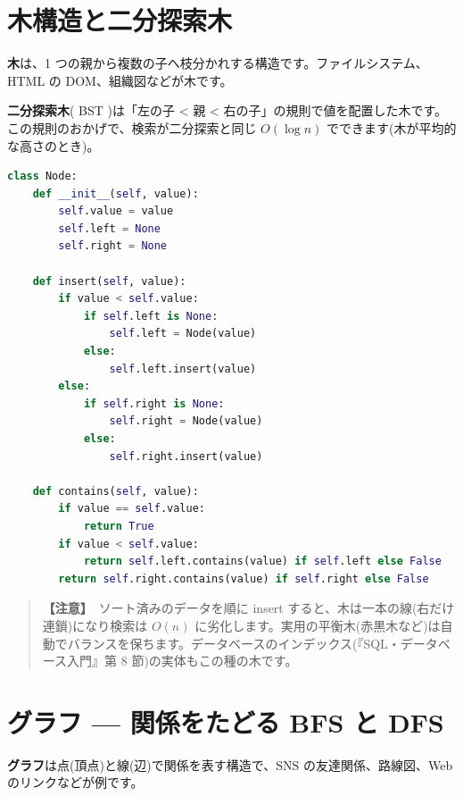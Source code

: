 \documentclass{article}
\begin{document}
\section{木構造と二分探索木}

\textbf{木}は、1 つの親から複数の子へ枝分かれする構造です。ファイルシステム、HTML の DOM、組織図などが木です。

\textbf{二分探索木}( BST )は「左の子 < 親 < 右の子」の規則で値を配置した木です。この規則のおかげで、検索が二分探索と同じ \(O(\log n)\) でできます(木が平均的な高さのとき)。

\begin{lstlisting}[language=Python]
class Node:
    def __init__(self, value):
        self.value = value
        self.left = None
        self.right = None

    def insert(self, value):
        if value < self.value:
            if self.left is None:
                self.left = Node(value)
            else:
                self.left.insert(value)
        else:
            if self.right is None:
                self.right = Node(value)
            else:
                self.right.insert(value)

    def contains(self, value):
        if value == self.value:
            return True
        if value < self.value:
            return self.left.contains(value) if self.left else False
        return self.right.contains(value) if self.right else False
\end{lstlisting}

\begin{quote}
\textbf{【注意】}\ ソート済みのデータを順に insert すると、木は一本の線(右だけ連鎖)になり検索は \(O(n)\) に劣化します。実用の平衡木(赤黒木など)は自動でバランスを保ちます。データベースのインデックス(『SQL・データベース入門』第 8 節)の実体もこの種の木です。
\end{quote}

\section{グラフ — 関係をたどる BFS と DFS}

\textbf{グラフ}は点(頂点)と線(辺)で関係を表す構造で、SNS の友達関係、路線図、Web のリンクなどが例です。
\end{document}
